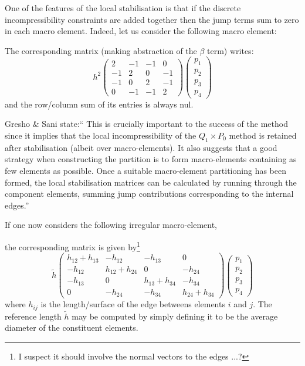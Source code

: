 One of the features of the local stabilisation is that if the discrete incompressibility 
constraints are added together then the jump terms sum to zero in each macro element.
Indeed, let us consider the following macro element: 

\begin{center}

\end{center}

The corresponding matrix (making abstraction of the $\beta$ term) writes:
\[
h^2
\left(
\begin{array}{cccc}
2 & -1 & -1 &0 \\
-1 & 2 & 0 & -1 \\
-1 & 0 & 2 & -1 \\
0 & -1 & -1 & 2
\end{array}
\right)
\left(
\begin{array}{c}
p_1 \\ p_2 \\ p_3 \\ p_4
\end{array}
\right)
\]
and the row/column sum of its entries is always nul.

Gresho \& Sani \cite{grsa} state:``
This is crucially important to the success of the method since it implies
that the local incompressibility of the $Q_1\times P_0$ method is retained
after stabilisation (albeit over macro-elements).
It also suggests that a good strategy when constructing the partition 
is to form macro-elements containing as few elements as possible. 
Once a suitable macro-element partitioning has been formed, the local stabilisation
matrices can be calculated by running through the component elements, 
summing jump contributions corresponding to the internal edges.'' 

If one now considers the following irregular macro-element,
\begin{center}

\end{center}
the corresponding matrix is given by\footnote{I suspect it should involve the normal vectors
to the edges ...?}
\[
\tilde{h}
\left(
\begin{array}{cccc}
h_{12}+h_{13} & -h_{12} & -h_{13} & 0\\
-h_{12} & h_{12}+h_{24} & 0 & -h_{24} \\
-h_{13} & 0 & h_{13}+h_{34} & -h_{34} \\
0 & -h_{24} & -h_{34} & h_{24} + h_{34}
\end{array}
\right)
\left(
\begin{array}{c}
p_1 \\ p_2 \\ p_3 \\ p_4
\end{array}
\right)
\]
where $h_{ij}$ is the length/surface of the edge betweens elements $i$ and $j$. 
The reference length $\tilde{h}$ may be computed by simply defining it to be the average 
diameter of the constituent elements. 

